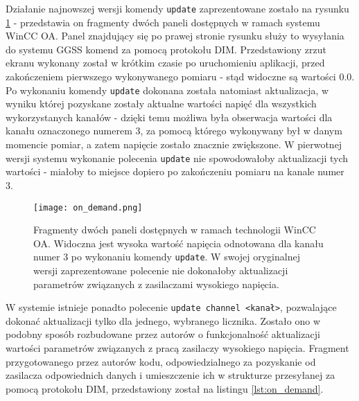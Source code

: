 Działanie najnowszej wersji komendy \lstinline{update} zaprezentowane zostało na rysunku \ref{fig:hv_on_demand} - przedstawia on fragmenty dwóch paneli dostępnych w ramach systemu WinCC OA. Panel znajdujący się po prawej stronie rysunku służy to wysyłania do systemu GGSS komend za pomocą protokołu DIM. Przedstawiony zrzut ekranu wykonany został w krótkim czasie po uruchomieniu aplikacji, przed zakończeniem pierwszego wykonywanego pomiaru - stąd widoczne są wartości 0.0. Po wykonaniu komendy \lstinline{update} dokonana została natomiast aktualizacja, w wyniku której pozyskane zostały aktualne wartości napięć dla wszystkich wykorzystanych kanałów - dzięki temu możliwa była obserwacja wartości dla kanału oznaczonego numerem 3, za pomocą którego wykonywany był w danym momencie pomiar, a zatem napięcie zostało znacznie zwiększone. W pierwotnej wersji systemu wykonanie polecenia \lstinline{update} nie spowodowałoby aktualizacji tych wartości - miałoby to miejsce dopiero po zakończeniu pomiaru na kanale numer 3.

\begin{figure}[H]
\centering
\texttt{[image: on\_demand.png]}
\caption{Fragmenty dwóch paneli dostępnych w ramach technologii WinCC OA. Widoczna jest wysoka wartość napięcia odnotowana dla kanału numer 3 po wykonaniu komendy \lstinline{update}. W swojej oryginalnej wersji zaprezentowane polecenie nie dokonałoby aktualizacji parametrów związanych z zasilaczami wysokiego napięcia.}
\label{fig:hv_on_demand}
\end{figure}

W systemie istnieje ponadto polecenie \lstinline{update channel <kanał>}, pozwalające dokonać aktualizacji tylko dla jednego, wybranego licznika. Zostało ono w podobny sposób rozbudowane przez autorów o funkcjonalność aktualizacji wartości parametrów związanych z pracą zasilaczy wysokiego napięcia. Fragment przygotowanego przez autorów kodu, odpowiedzialnego za pozyskanie od zasilacza odpowiednich danych i umieszczenie ich w strukturze przesyłanej za pomocą protokołu DIM, przedstawiony został na listingu \ref{lst:on_demand}.



